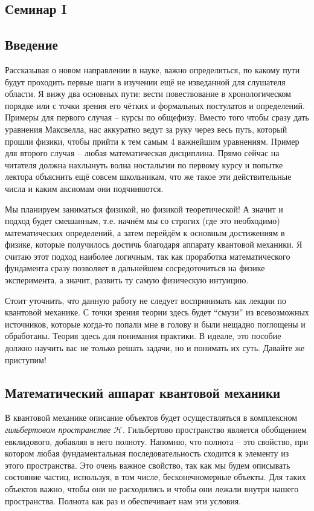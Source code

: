\begin{center}
    \section{Семинар I}
\end{center}
\subsection{Введение}


\hspace{1em} Рассказывая о новом направлении в науке, важно определиться, по какому пути будут проходить первые шаги в изучении ещё не изведанной для слушателя области. Я вижу два основных пути: вести повествование в хронологическом порядке или с точки зрения его чётких и формальных постулатов и определений. Примеры для первого случая -- курсы по общефизу. Вместо того чтобы сразу дать уравнения Максвелла, нас аккуратно ведут за руку через весь путь, который прошли физики, чтобы прийти к тем самым 4 важнейшим уравнениям. Пример для второго случая -- любая математическая дисциплина. Прямо сейчас на читателя должна нахлынуть волна ностальгии по первому курсу и попытке лектора объяснить ещё совсем школьникам, что же такое эти действительные числа и каким аксиомам они подчиняются.

Мы планируем заниматься физикой, но физикой теоретической! А значит и подход будет смешанным, т.е. начнём мы со строгих (где это необходимо) математических определений, а затем перейдём к основным достижениям в физике, которые получилось достичь благодаря аппарату квантовой механики. Я считаю этот подход наиболее логичным, так как проработка математического фундамента сразу позволяет в дальнейшем сосредоточиться на физике эксперимента, а значит, развить ту самую физическую интуицию.

Стоит уточнить, что данную работу не следует воспринимать как лекции по квантовой механике. С точки зрения теории здесь будет ``смузи'' из всевозможных источников, которые когда-то попали мне в голову и были нещадно поглощены и обработаны. Теория здесь для понимания практики. В идеале, это пособие должно научить вас не только решать задачи, но и понимать их суть. Давайте же приступим!

\subsection{Математический аппарат квантовой механики}
\hspace{1em} В квантовой механике описание объектов будет осуществляться в комплексном \textit{гильбертовом пространстве} $\mathcal{H}$. Гильбертово пространство является обобщением евклидового, добавляя в него полноту. Напомню, что полнота -- это свойство, при котором любая фундаментальная последовательность сходится к элементу из этого пространства. Это очень важное свойство, так как мы будем описывать состояние частиц, используя, в том числе, бесконечномерные объекты. Для таких объектов важно, чтобы они не расходились и чтобы они лежали внутри нашего пространства. Полнота как раз и обеспечивает нам эти условия. 

